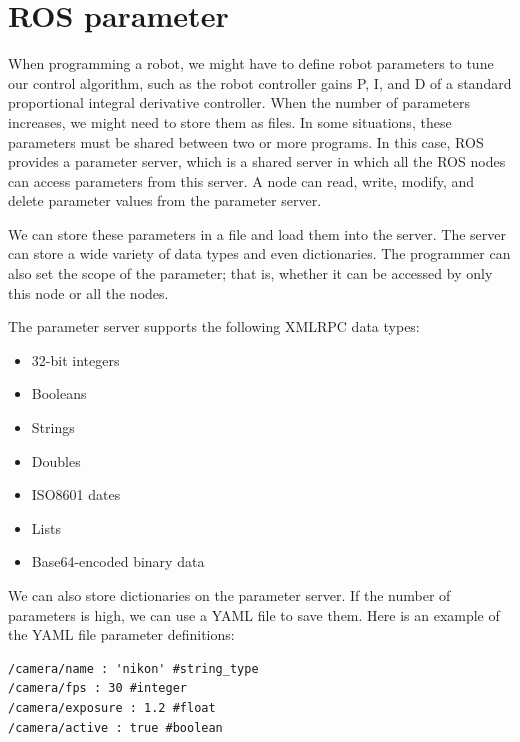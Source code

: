\documentclass[../../main]{subfiles}
\begin{document}
\section{ROS parameter}
When programming a robot, we might have to define robot parameters to tune
our control algorithm, such as the robot controller gains P, I, and D of a standard
proportional integral derivative controller. When the number of parameters increases,
we might need to store them as files. In some situations, these parameters must be shared
between two or more programs. In this case, ROS provides a parameter server, which is a
shared server in which all the ROS nodes can access parameters from this server. A node
can read, write, modify, and delete parameter values from the parameter server.

We can store these parameters in a file and load them into the server. The server can store a wide variety of data types and even dictionaries. The programmer can also set the scope of the parameter; that is, whether it can be accessed by only this node or all the nodes.

The parameter server supports the following XMLRPC data types:
\begin{itemize}
    \item 32-bit integers
    \item Booleans
    \item Strings
    \item Doubles
    \item ISO8601 dates
    \item Lists
    \item Base64-encoded binary data
\end{itemize}

We can also store dictionaries on the parameter server. If the number of parameters is high, we can use a YAML file to save them. Here is an example of the YAML file parameter definitions:

\begin{verbatim}
/camera/name : 'nikon' #string_type
/camera/fps : 30 #integer
/camera/exposure : 1.2 #float
/camera/active : true #boolean
\end{verbatim}
\end{document}
